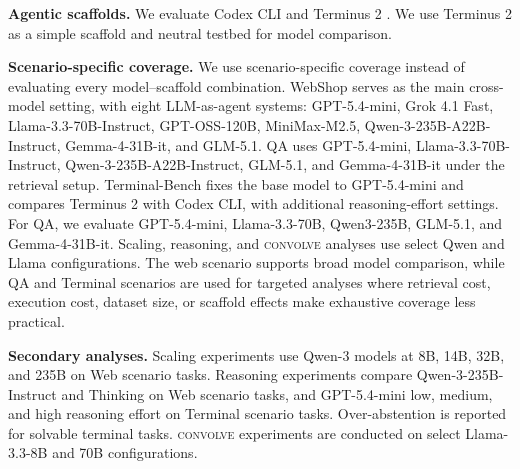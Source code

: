 \documentclass{llmxive}
\providecommand{\method}{\textsc{convolve}\xspace}
\begin{document}
\vspace{-1mm}
\textbf{Agentic scaffolds.} We evaluate Codex CLI and Terminus 2 \cite{merrill2026terminal}. We use Terminus 2 as a simple scaffold and neutral testbed for model comparison.

\vspace{-1mm}
\textbf{Scenario-specific coverage.} We use scenario-specific coverage instead of evaluating every model--scaffold combination. WebShop serves as the main cross-model setting, with eight LLM-as-agent systems: GPT-5.4-mini, Grok 4.1 Fast, Llama-3.3-70B-Instruct, GPT-OSS-120B, MiniMax-M2.5, Qwen-3-235B-A22B-Instruct, Gemma-4-31B-it, and GLM-5.1. QA uses GPT-5.4-mini, Llama-3.3-70B-Instruct, Qwen-3-235B-A22B-Instruct, GLM-5.1, and Gemma-4-31B-it under the retrieval setup. Terminal-Bench fixes the base model to GPT-5.4-mini and compares Terminus 2 with Codex CLI, with additional reasoning-effort settings. For QA, we evaluate GPT-5.4-mini, Llama-3.3-70B, Qwen3-235B, GLM-5.1, and Gemma-4-31B-it. Scaling, reasoning, and \method analyses use select Qwen and Llama configurations. The web scenario supports broad model comparison, while QA and Terminal scenarios are used for targeted analyses where retrieval cost, execution cost, dataset size, or scaffold effects make exhaustive coverage less practical.

\vspace{-1mm}
\textbf{Secondary analyses.} Scaling experiments use Qwen-3 models at 8B, 14B, 32B, and 235B on Web scenario tasks. Reasoning experiments compare Qwen-3-235B-Instruct and Thinking on Web scenario tasks, and GPT-5.4-mini low, medium, and high reasoning effort on Terminal scenario tasks. Over-abstention is reported for solvable terminal tasks. \method experiments are conducted on select Llama-3.3-8B and 70B configurations.



\end{document}

